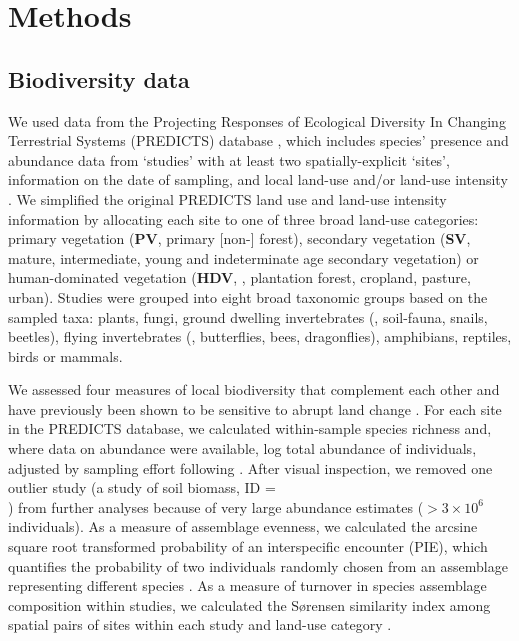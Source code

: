 \section{Methods}
\subsection{Biodiversity data} 
We used data from the Projecting Responses of Ecological Diversity In Changing Terrestrial Systems (PREDICTS) database \citep{Hudson2016}, which includes species’ presence and abundance data from ‘studies’ with at least two spatially-explicit ‘sites’, information on the date of sampling, and local land-use and/or land-use intensity \citep{Hudson2016}. We simplified the original PREDICTS land use and land-use intensity information \citep{Hudson2014,Hudson2016} by allocating each site to one of three broad land-use categories: primary vegetation (\textbf{PV}, \ie primary [non-] forest), secondary vegetation (\textbf{SV}, \ie mature, intermediate, young and indeterminate age secondary vegetation) or human-dominated vegetation (\textbf{HDV}, \ie, plantation forest, cropland, pasture, urban). Studies were grouped into eight broad taxonomic groups based on the sampled taxa: plants, fungi, ground dwelling invertebrates (\eg, soil-fauna, snails, beetles), flying invertebrates (\eg, butterflies, bees, dragonflies), amphibians, reptiles, birds or mammals. 

We assessed four measures of local biodiversity that complement each other and have previously been shown to be sensitive to abrupt land change \citep{Supp2014,Santini2016}. For each site in the PREDICTS database, we calculated within-sample species richness and, where data on abundance were available, log total abundance of individuals, adjusted by sampling effort following \cite{Newbold2014b}. After visual inspection, we removed one outlier study (a study of soil biomass, ID = \\ ) from further analyses because of very large abundance estimates ($> 3\times10^6$ individuals). As a measure of assemblage evenness, we calculated the arcsine square root transformed probability of an interspecific encounter (PIE), which quantifies the probability of two individuals randomly chosen from an assemblage representing different species \citep{Hurlbert1971}. As a measure of turnover in species assemblage composition within studies, we calculated the S\o rensen similarity index among spatial pairs of sites within each study and land-use category \citep{Magurran2004}.

